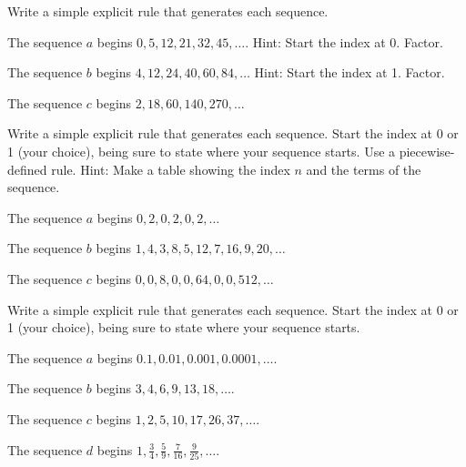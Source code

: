 \begin{exer}[\exerU]  %
\label{exer_NTE_factor}  
    Write a simple explicit rule that generates each sequence.  
        \begin{exerpart}
            \item The sequence $a$ begins $0, 5, 12, 21, 32, 45, \ldots$.  Hint: Start the index at 0. Factor. %
            \item The sequence $b$ begins $4, 12, 24, 40, 60, 84, \ldots$ Hint: Start the index at 1. Factor. %
            \item The sequence $c$ begins $2, 18, 60, 140, 270, \ldots $ %
        \end{exerpart}
\end{exer}

\begin{exer}[\exerU] %
\label{exer_NTE_piecewise}
    Write a simple explicit rule that generates each sequence.  Start the index at 0 or 1 (your choice), being sure to state where your sequence starts. Use a piecewise-defined rule. Hint: Make a table showing the index $n$ and the terms of the sequence.
        \begin{exerpart}
            \item The sequence $a$ begins $0, 2, 0, 2, 0, 2, \ldots$ 
            \item The sequence $b$ begins $1,4,3,8,5,12,7,16,9,20,\ldots$
           \item The sequence $c$ begins $0, 0, 8, 0, 0, 64, 0, 0, 512, \ldots$
        \end{exerpart}
\end{exer}

\begin{exer}[\exerU] %
\label{exer_next_term} 
    Write a simple explicit rule that generates each sequence.  Start the index at 0 or 1 (your choice), being sure to state where your sequence starts.   
        \begin{exerpart}
            \item The sequence $a$ begins $0.1, 0.01, 0.001, 0.0001, \ldots$.    
            \item The sequence $b$ begins $3, 4, 6, 9, 13, 18, \ldots$. %
            \item The sequence $c$ begins $1, 2, 5, 10, 17, 26, 37, \ldots$. %
            \item The sequence $d$ begins $1, \frac{3}{4}, \frac{5}{9}, \frac{7}{16}, \frac{9}{25}, \ldots $.
        \end{exerpart}
\end{exer}

